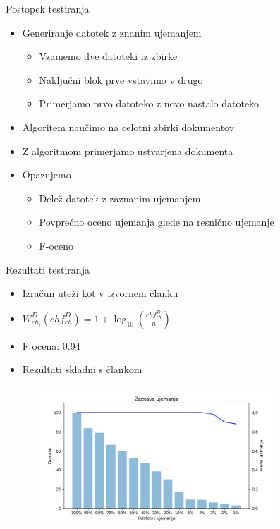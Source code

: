 \documentclass[xcolor=dvipsnames,compress]{beamer}
\begin{document}
    \begin{frame}{Postopek testiranja}
    \begin{itemize}
        \item Generiranje datotek z znanim ujemanjem
        \begin{itemize}
            \item Vzamemo dve datoteki iz zbirke
            \item Naključni blok prve vstavimo v drugo
            \item Primerjamo prvo datoteko z novo nastalo datoteko
        \end{itemize}
        \item Algoritem naučimo na celotni zbirki dokumentov
        \item Z algoritmom primerjamo ustvarjena dokumenta
        \item Opazujemo
        \begin{itemize}
            \item Delež datotek z zaznanim ujemanjem
            \item Povprečno oceno ujemanja glede na resnično ujemanje
            \item F-oceno
        \end{itemize}
    \end{itemize}
\end{frame}

\begin{frame}{Rezultati testiranja}
    \begin{itemize}
        \item Izračun uteži kot v izvornem članku
        \item $ W_{ch_i}^{D}(ch f_{ch}^D) = 1 + \log_{10}\left(\frac{ch f_{ch}^D}{n}\right)$
        \item F ocena: 0.94
        \item Rezultati skladni s člankom
    \end{itemize}
    
    \begin{figure}[ht!]
        \label{fig:subfigures}
        \begin{center}
            \includegraphics[width=0.8\textwidth]{figs/njihov_majhen.png}
        \end{center}
    \end{figure}
    
\end{frame}
\end{document}
